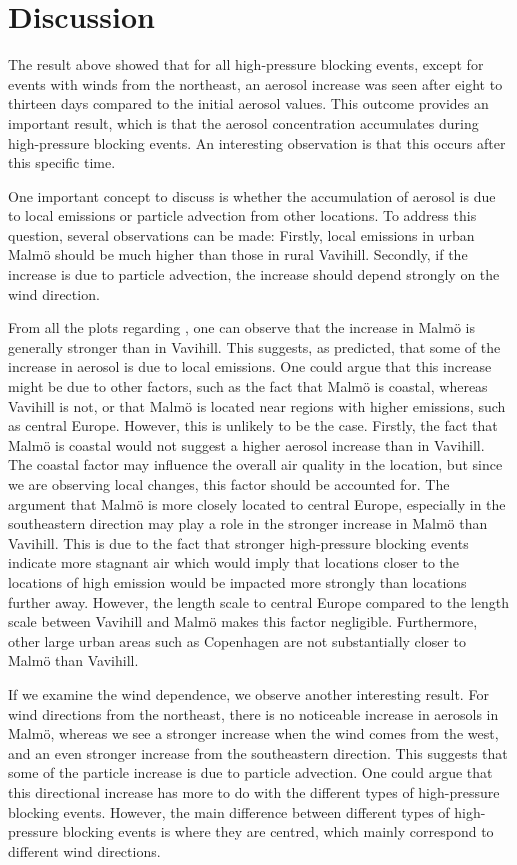 \newpage
\section{Discussion}
The result above showed that for all high-pressure blocking events, except for events with winds from the northeast, an aerosol increase was seen after eight to thirteen days compared to the initial aerosol values. This outcome provides an important result, which is that the aerosol concentration accumulates during high-pressure blocking events. An interesting observation is that this occurs after this specific time. 

One important concept to discuss is whether the accumulation of aerosol is due to local emissions or particle advection from other locations. To address this question, several observations can be made: Firstly, local emissions in urban Malmö should be much higher than those in rural Vavihill. Secondly, if the increase is due to particle advection, the increase should depend strongly on the wind direction. 

From all the plots regarding \PM, one can observe that the increase in Malmö is generally stronger than in Vavihill. This suggests, as predicted, that some of the increase in aerosol is due to local emissions. One could argue that this increase might be due to other factors, such as the fact that Malmö is coastal, whereas Vavihill is not, or that Malmö is located near regions with higher emissions, such as central Europe. However, this is unlikely to be the case. Firstly, the fact that Malmö is coastal would not suggest a higher aerosol increase than in Vavihill. The coastal factor may influence the overall air quality in the location, but since we are observing local changes, this factor should be accounted for. The argument that Malmö is more closely located to central Europe, especially in the southeastern direction may play a role in the stronger increase in Malmö than Vavihill. This is due to the fact that stronger high-pressure blocking events indicate more stagnant air which would imply that locations closer to the locations of high emission would be impacted more strongly than locations further away. However, the length scale to central Europe compared to the length scale between Vavihill and Malmö makes this factor negligible. Furthermore, other large urban areas such as Copenhagen are not substantially closer to Malmö than Vavihill. 

If we examine the wind dependence, we observe another interesting result. For wind directions from the northeast, there is no noticeable increase in aerosols in Malmö, whereas we see a stronger increase when the wind comes from the west, and an even stronger increase from the southeastern direction. This suggests that some of the particle increase is due to particle advection. One could argue that this directional increase has more to do with the different types of high-pressure blocking events. However, the main difference between different types of high-pressure blocking events is where they are centred, which mainly correspond to different wind directions. 


